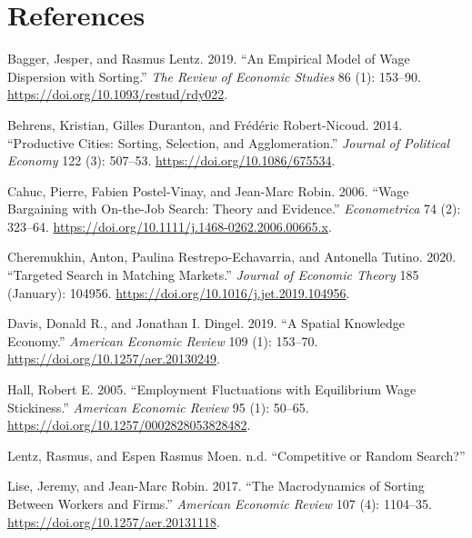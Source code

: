 \documentclass[
  letterpaper,
  DIV=11,
  numbers=noendperiod]{scrreprt}
\newlength{\cslhangindent}
\newlength{\cslentryspacingunit} %
\newenvironment{CSLReferences}[2] %
 {%
  \setlength{\parindent}{0pt}
  \ifodd #1
  \let\oldpar\par
  \def\par{\hangindent=\cslhangindent\oldpar}
  \fi
  \setlength{\parskip}{#2\cslentryspacingunit}
 }%
 {}
\begin{document}
\hypertarget{bibliography}{%
\chapter*{References}\label{bibliography}}

\hypertarget{refs}{}
\begin{CSLReferences}{1}{0}
\leavevmode{}%
Bagger, Jesper, and Rasmus Lentz. 2019. {``An {Empirical Model} of {Wage
Dispersion} with {Sorting}.''} \emph{The Review of Economic Studies} 86
(1): 153--90. \url{https://doi.org/10.1093/restud/rdy022}.

\leavevmode{}%
Behrens, Kristian, Gilles Duranton, and Frédéric Robert-Nicoud. 2014.
{``Productive {Cities}: {Sorting}, {Selection}, and {Agglomeration}.''}
\emph{Journal of Political Economy} 122 (3): 507--53.
\url{https://doi.org/10.1086/675534}.

\leavevmode{}%
Cahuc, Pierre, Fabien Postel-Vinay, and Jean-Marc Robin. 2006. {``Wage
{Bargaining} with {On-the-Job Search}: {Theory} and {Evidence}.''}
\emph{Econometrica} 74 (2): 323--64.
\url{https://doi.org/10.1111/j.1468-0262.2006.00665.x}.

\leavevmode{}%
Cheremukhin, Anton, Paulina Restrepo-Echavarria, and Antonella Tutino.
2020. {``Targeted Search in Matching Markets.''} \emph{Journal of
Economic Theory} 185 (January): 104956.
\url{https://doi.org/10.1016/j.jet.2019.104956}.

\leavevmode{}%
Davis, Donald R., and Jonathan I. Dingel. 2019. {``A {Spatial Knowledge
Economy}.''} \emph{American Economic Review} 109 (1): 153--70.
\url{https://doi.org/10.1257/aer.20130249}.

\leavevmode{}%
Hall, Robert E. 2005. {``Employment {Fluctuations} with {Equilibrium
Wage Stickiness}.''} \emph{American Economic Review} 95 (1): 50--65.
\url{https://doi.org/10.1257/0002828053828482}.

\leavevmode{}%
Lentz, Rasmus, and Espen Rasmus Moen. n.d. {``Competitive or {Random
Search}?''}

\leavevmode{}%
Lise, Jeremy, and Jean-Marc Robin. 2017. {``The {Macrodynamics} of
{Sorting} Between {Workers} and {Firms}.''} \emph{American Economic
Review} 107 (4): 1104--35. \url{https://doi.org/10.1257/aer.20131118}.


\end{CSLReferences}
\end{document}
